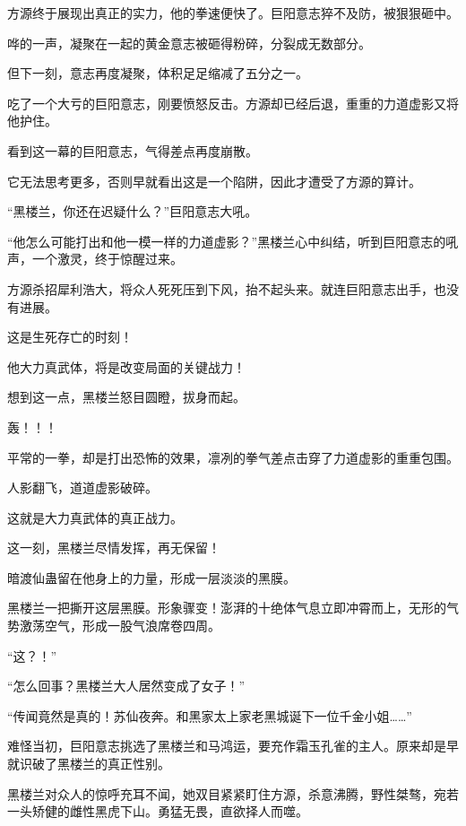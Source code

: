
\begin{this_body}



方源终于展现出真正的实力，他的拳速便快了。巨阳意志猝不及防，被狠狠砸中。

哗的一声，凝聚在一起的黄金意志被砸得粉碎，分裂成无数部分。

但下一刻，意志再度凝聚，体积足足缩减了五分之一。

吃了一个大亏的巨阳意志，刚要愤怒反击。方源却已经后退，重重的力道虚影又将他护住。

看到这一幕的巨阳意志，气得差点再度崩散。

它无法思考更多，否则早就看出这是一个陷阱，因此才遭受了方源的算计。

“黑楼兰，你还在迟疑什么？”巨阳意志大吼。

“他怎么可能打出和他一模一样的力道虚影？”黑楼兰心中纠结，听到巨阳意志的吼声，一个激灵，终于惊醒过来。

方源杀招犀利浩大，将众人死死压到下风，抬不起头来。就连巨阳意志出手，也没有进展。

这是生死存亡的时刻！

他大力真武体，将是改变局面的关键战力！

想到这一点，黑楼兰怒目圆瞪，拔身而起。

轰！！！

平常的一拳，却是打出恐怖的效果，凛冽的拳气差点击穿了力道虚影的重重包围。

人影翻飞，道道虚影破碎。

这就是大力真武体的真正战力。

这一刻，黑楼兰尽情发挥，再无保留！

暗渡仙蛊留在他身上的力量，形成一层淡淡的黑膜。

黑楼兰一把撕开这层黑膜。形象骤变！澎湃的十绝体气息立即冲霄而上，无形的气势激荡空气，形成一股气浪席卷四周。

“这？！”

“怎么回事？黑楼兰大人居然变成了女子！”

“传闻竟然是真的！苏仙夜奔。和黑家太上家老黑城诞下一位千金小姐……”

难怪当初，巨阳意志挑选了黑楼兰和马鸿运，要充作霜玉孔雀的主人。原来却是早就识破了黑楼兰的真正性别。

黑楼兰对众人的惊呼充耳不闻，她双目紧紧盯住方源，杀意沸腾，野性桀骜，宛若一头矫健的雌性黑虎下山。勇猛无畏，直欲择人而噬。


\end{this_body}
